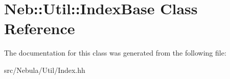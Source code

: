 \hypertarget{classNeb_1_1Util_1_1IndexBase}{\section{\-Neb\-:\-:\-Util\-:\-:\-Index\-Base \-Class \-Reference}
\label{classNeb_1_1Util_1_1IndexBase}
}


\-The documentation for this class was generated from the following file\-:\begin{DoxyCompactItemize}
\item 
src/\-Nebula/\-Util/\-Index.\-hh\end{DoxyCompactItemize}
